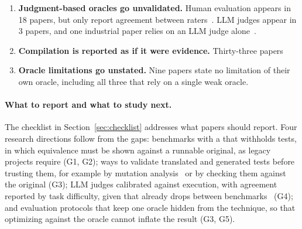 \begin{added}
\begin{enumerate}[label=\textbf{G\arabic*.}]
  \item \textbf{Judgment-based oracles go unvalidated.} Human evaluation appears in 18 papers, but only  report agreement between raters~\cite{pylibmig,translibeval,recodeagent,fruntke}. LLM judges appear in 3 papers, and one industrial paper relies on an LLM judge alone~\cite{wca4z}. 
  \item \textbf{Compilation is reported as if it were evidence.} Thirty-three papers  
  \item \textbf{Oracle limitations go unstated.} Nine papers state no limitation of their own oracle, including all three that rely on a single weak oracle. 
\end{enumerate}

\paragraph{What to report and what to study next.} The checklist in Section~\ref{sec:checklist} addresses what papers should report. Four research directions follow from the gaps: benchmarks with a  that withholds tests, in which equivalence must be shown against a runnable original, as legacy projects require (G1, G2); ways to validate translated and generated tests before trusting them, for example by mutation analysis~\cite{mbta} or by checking them against the original (G3); LLM judges calibrated against execution, with agreement reported by task difficulty, given that  already drops between benchmarks~\cite{moumoula} (G4); and evaluation protocols that keep one oracle hidden from the technique, so that optimizing against the oracle cannot inflate the result (G3, G5).
\end{added}

